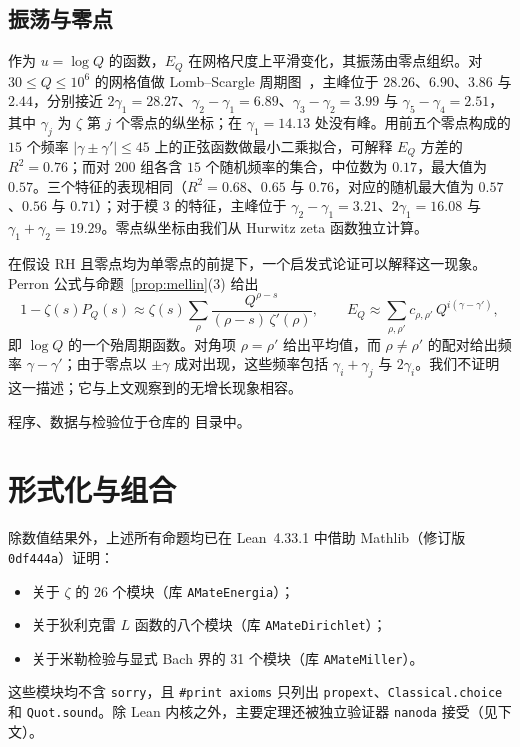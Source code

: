 \documentclass[11pt,a4paper]{amsart}
\theoremstyle{definition}
\theoremstyle{remark}
\begin{document}
\subsection*{振荡与零点}
作为 $u=\log Q$ 的函数，$E_Q$ 在网格尺度上平滑变化，其振荡由零点组织。对 $30\le Q\le10^6$ 的网格值做 Lomb--Scargle 周期图~\cite{Lomb,Scargle}，主峰位于 $28.26$、$6.90$、$3.86$ 与 $2.44$，分别接近 $2\gamma_1=28.27$、$\gamma_2-\gamma_1=6.89$、$\gamma_3-\gamma_2=3.99$ 与 $\gamma_5-\gamma_4=2.51$，其中 $\gamma_j$ 为 $\zeta$ 第 $j$ 个零点的纵坐标；在 $\gamma_1=14.13$ 处没有峰。用前五个零点构成的 $15$ 个频率 $|\gamma\pm\gamma'|\le45$ 上的正弦函数做最小二乘拟合，可解释 $E_Q$ 方差的 $R^2=0.76$；而对 $200$ 组各含 $15$ 个随机频率的集合，中位数为 $0.17$，最大值为 $0.57$。三个特征的表现相同（$R^2=0.68$、$0.65$ 与 $0.76$，对应的随机最大值为 $0.57$、$0.56$ 与 $0.71$）；对于模 $3$ 的特征，主峰位于 $\gamma_2-\gamma_1=3.21$、$2\gamma_1=16.08$ 与 $\gamma_1+\gamma_2=19.29$。零点纵坐标由我们从 Hurwitz zeta 函数独立计算。

在假设 RH 且零点均为单零点的前提下，一个启发式论证可以解释这一现象。Perron 公式与命题~\ref{prop:mellin}(3) 给出
\[
1-\zeta(s)P_Q(s)\approx\zeta(s)\sum_\rho\frac{Q^{\rho-s}}{(\rho-s)\,\zeta'(\rho)},\qquad
E_Q\approx\sum_{\rho,\rho'}c_{\rho,\rho'}\,Q^{i(\gamma-\gamma')},
\]
即 $\log Q$ 的一个殆周期函数。对角项 $\rho=\rho'$ 给出平均值，而 $\rho\ne\rho'$ 的配对给出频率 $\gamma-\gamma'$；由于零点以 $\pm\gamma$ 成对出现，这些频率包括 $\gamma_i+\gamma_j$ 与 $2\gamma_i$。我们不证明这一描述；它与上文观察到的无增长现象相容。

程序、数据与检验位于仓库的  目录中。

\section{形式化与组合}\label{sec:formal}

除数值结果外，上述所有命题均已在 Lean~4.33.1 中借助 Mathlib（修订版 \texttt{0df444a}）证明：
\begin{itemize}
\item 关于 $\zeta$ 的 26 个模块（库 \texttt{AMateEnergia}）；
\item 关于狄利克雷 $L$ 函数的八个模块（库 \texttt{AMateDirichlet}）；
\item 关于米勒检验与显式 Bach 界的 31 个模块（库 \texttt{AMateMiller}）。
\end{itemize}
这些模块均不含 \texttt{sorry}，且 \texttt{\#print axioms} 只列出 \texttt{propext}、\texttt{Classical.choice} 和 \texttt{Quot.sound}。除 Lean 内核之外，主要定理还被独立验证器 \texttt{nanoda} 接受（见下文）。
\end{document}
